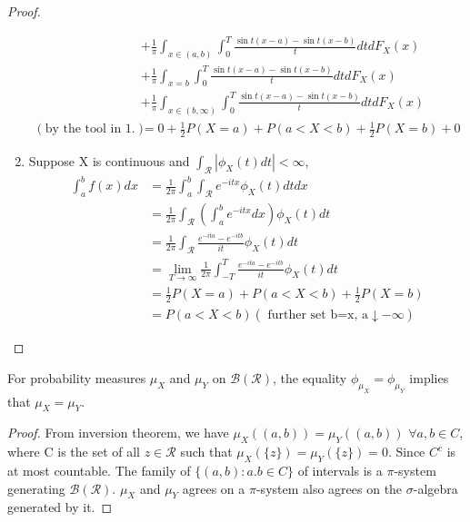 \documentclass[../Transformation.tex]{subfiles}
\begin{document}
\begin{proof}
\begin{enumerate}
\begin{align*}
		&+\frac{1}{\pi}\int_{x\in(a,b)}\int_0^{T}\frac{\sin t(x-a) - \sin t(x-b)}{t}dtdF_X(x)\\
		&+\frac{1}{\pi}\int_{x=b}\int_0^{T}\frac{\sin t(x-a) - \sin t(x-b)}{t}dtdF_X(x)\\
		&+\frac{1}{\pi}\int_{x\in(b,\infty)}\int_0^{T}\frac{\sin t(x-a) - \sin t(x-b)}{t}dtdF_X(x)\\
		(\mbox{by the tool in 1.})&=0+\frac{1}{2}P(X=a) + P(a<X<b) + \frac{1}{2}P(X=b) + 0
		\end{align*}
	\item Suppose X is continuous and $\int_{\mathcal{R}}|\phi_X(t)dt|<\infty$,
	\begin{align*}
	\int_a^bf(x)dx&=\frac{1}{2\pi}\int_a^b\int_{\mathcal{R}}e^{-itx}\phi_X(t)dtdx\\
	&=\frac{1}{2\pi}\int_{\mathcal{R}}(\int_a^be^{-itx}dx)\phi_X(t)dt\\
	&=\frac{1}{2\pi}\int_{\mathcal{R}}\frac{e^{-ita}-e^{-itb}}{it}\phi_X(t)dt\\
	&=\lim_{T\rightarrow\infty}\frac{1}{2\pi}\int_{-T}^T\frac{e^{-ita}-e^{-itb}}{it}\phi_X(t)dt\\
	&=\frac{1}{2}P(X=a) + P(a<X<b) + \frac{1}{2}P(X=b)\\
	&=P(a<X<b)
	(  \mbox{ further set b=x, a$\downarrow -\infty$})
	\end{align*}
	\end{enumerate}
\end{proof}
\begin{corollary}
For probability measures $\mu_X$ and $\mu_Y$ on $\mathcal{B}(\mathcal{R})$, the equality $\phi_{\mu_X}=\phi_{\mu_Y}$ implies that $\mu_X=\mu_Y$.
\end{corollary}
\begin{proof}
From inversion theorem, we have $\mu_X((a,b))=\mu_Y((a,b))$ $\forall a,b\in C$, where C is the set of all $z\in\mathcal{R}$ such that $\mu_X(\{z\})=\mu_Y(\{z\})=0$. Since $C^c$ is at most countable. The family of $\{(a,b):a.b\in C\}$ of intervals is a $\pi$-system generating $\mathcal{B}(\mathcal{R})$. $\mu_X$ and $\mu_Y$ agrees on a $\pi$-system also agrees on the $\sigma$-algebra generated by it.
\end{proof}
\end{document}
